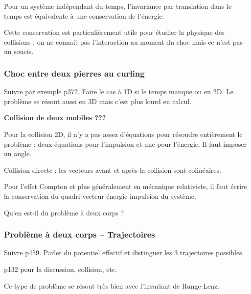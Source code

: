Pour un système indépendant du temps, l'invariance par translation dans le temps est équivalente à une conservation de l'énergie.

\begin{transition}
Cette conservation est particulièrement utile pour étudier la physique des collisions : on ne connait pas l'interaction au moment du choc mais ce n'est pas un soucis.
\end{transition}

\subsubsection{Choc entre deux pierres au curling}

Suivre par exemple \cite{Seigne2014} p372.
Faire le cas à 1D si le temps manque ou en 2D.
Le problème se résout aussi en 3D mais c'est plus lourd en calcul.

\begin{experience}
\textbf{Collision de deux mobiles ???}
\end{experience}

\begin{remarque}Pour la collision 2D, il n'y a pas assez d'équations pour résoudre entièrement le problème : deux équations pour l'impulsion et une pour l'énergie.
Il faut imposer un angle.

\noindent
Collision directe : les vecteurs avant et après la collision sont colinéaires.

\noindent
Pour l'effet Compton et plus généralement en mécanique relativiste, il faut écrire la conservation du quadri-vecteur énergie impulsion du système.
\end{remarque}

\begin{transition}
Qu'en est-il du problème à deux corps ?
\end{transition}

\subsubsection{Problème à deux corps -- Trajectoires}

Suivre \cite{Michel2017} p459.
Parler du potentiel effectif et distinguer les 3 trajectoires possibles.

\cite{Faroux1996} p132 pour la discussion, collision, etc.

\begin{remarque}
Ce type de problème se résout très bien avec l'invariant de Runge-Lenz.
\end{remarque}

